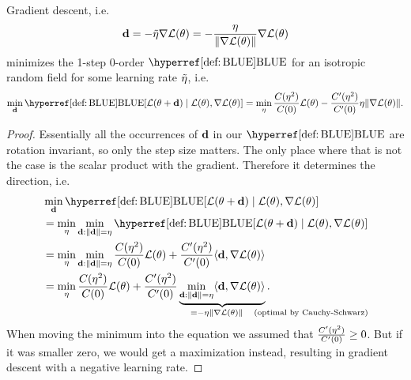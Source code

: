 \begin{corollary}
	Gradient descent, i.e.
	\begin{equation*}
		\mathbf{d} = - \tilde{\eta} \nabla\mathcal{L}(\theta)
		= - \frac{\eta}{\|\nabla\mathcal{L}(\theta)\|} \nabla\mathcal{L}(\theta)
	\end{equation*}
	minimizes the 1-step 0-order \(\BLUE\) for an isotropic random
	field for some learning rate \(\tilde{\eta}\), i.e.
	\begin{equation*}
		\min_{\step}
		\BLUE[\Loss(\param + \step)\mid \Loss(\param), \nabla\Loss(\param)]
		= \min_{\lr} \frac{\iC(\lr^2)}{\iC(0)} \Loss(\param)
		- \frac{\iC'(\lr^2)}{\iC'(0)} \lr \|\nabla\Loss(\param)\|.
	\end{equation*}
\end{corollary}
\begin{proof}
	Essentially all the occurrences of \(\mathbf{d}\) in our \(\BLUE\) are
	rotation invariant, so only the step size matters. The only place where that
	is not the case is the scalar product with the gradient. Therefore it
	determines the direction, i.e.
	\begin{align*}
		&\min_{\step}
		\BLUE[\Loss(\param + \step)\mid \Loss(\param), \nabla\Loss(\param)]\\
		&= \min_{\lr}\min_{\step:\|\step\|=\lr}
		\BLUE[\Loss(\param + \step)\mid \Loss(\param), \nabla\Loss(\param)]\\
		&= \min_{\lr}\min_{\step:\|\step\|=\lr}
		\frac{\iC(\lr^2)}{\iC(0)} \Loss(\param)
		+ \frac{\iC'(\lr^2)}{\iC'(0)} \langle \step, \nabla\Loss(\param)\rangle\\
		&= \min_{\lr}
		\frac{\iC(\lr^2)}{\iC(0)} \Loss(\param)
		+ \frac{\iC'(\lr^2)}{\iC'(0)}
		\underbrace{\min_{\step:\|\step\|=\lr}\langle \step, \nabla\Loss(\param)\rangle}_{
			= -\eta \|\nabla \Loss(\param)\| \quad \mathrlap{\text{(optimal by Cauchy-Schwarz)}}
		}.\hphantom{\text{by Cauchy-Schwarz}}
	\end{align*}
	When moving the minimum into the equation we assumed that
	\(\frac{C'(\eta^2)}{C'(0)}\ge 0\). But if it was smaller zero, we would get a
	maximization instead, resulting in gradient descent with a negative learning
	rate.
\end{proof}




